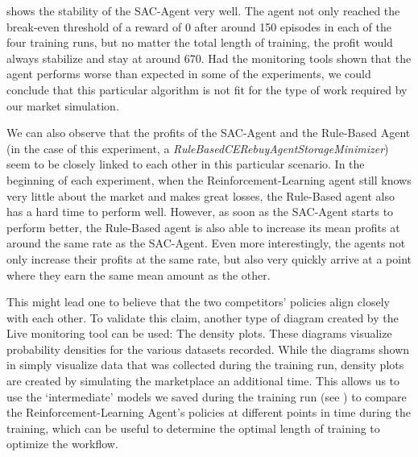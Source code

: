  shows the stability of the SAC-Agent very well. The agent not only reached the break-even threshold of a reward of 0 after around 150 episodes in each of the four training runs, but no matter the total length of training, the profit would always stabilize and stay at around 670. Had the monitoring tools shown that the agent performs worse than expected in some of the experiments, we could conclude that this particular algorithm is not fit for the type of work required by our market simulation.

We can also observe that the profits of the SAC-Agent and the Rule-Based Agent (in the case of this experiment, a \emph{RuleBasedCERebuyAgentStorageMinimizer}) seem to be closely linked to each other in this particular scenario. In the beginning of each experiment, when the Reinforcement-Learning agent still knows very little about the market and makes great losses, the Rule-Based agent also has a hard time to perform well. However, as soon as the SAC-Agent starts to perform better, the Rule-Based agent is also able to increase its mean profits at around the same rate as the SAC-Agent. Even more interestingly, the agents not only increase their profits at the same rate, but also very quickly arrive at a point where they earn the same mean amount as the other.

This might lead one to believe that the two competitors' policies align closely with each other. To validate this claim, another type of diagram created by the Live monitoring tool can be used: The density plots. These diagrams visualize probability densities for the various datasets recorded. While the diagrams shown in  simply visualize data that was collected during the training run, density plots are created by simulating the marketplace an additional time. This allows us to use the `intermediate' models we saved during the training run (see ) to compare the Reinforcement-Learning Agent's policies at different points in time during the training, which can be useful to determine the optimal length of training to optimize the workflow.

